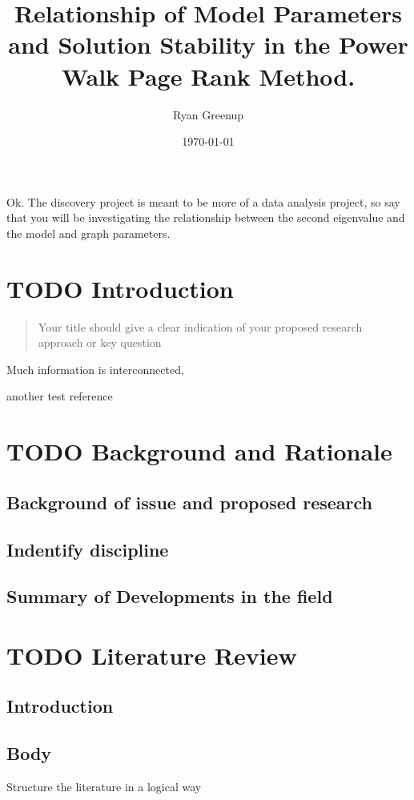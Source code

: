 \documentclass[11pt]{article}
\author{Ryan Greenup}
\date{\today}
\title{Relationship of Model Parameters and Solution Stability in the Power Walk Page Rank Method.}
\begin{document}
\maketitle
\tableofcontents

Ok. The discovery project is meant to be more of a data analysis project, so say
that you will be investigating the relationship between the second eigenvalue
and the model and graph parameters.

\section{{\bfseries\sffamily TODO} Introduction}
\label{sec:org19b18a9}
\begin{quote}
Your title should give a clear indication of your proposed research approach or
key question
\end{quote}

Much information is interconnected, \cite{teamSparseMatrixOperations}


another test reference \cite{kamvarAdaptiveMethodsComputation2004}

\section{{\bfseries\sffamily TODO} Background and Rationale}
\label{sec:orgf7c13c7}
\subsection{Background of issue and proposed research}
\label{sec:org5d62ccf}
\subsection{Indentify discipline}
\label{sec:org7f8213d}
\subsection{Summary of Developments in the field}
\label{sec:org34dce0a}
\section{{\bfseries\sffamily TODO} Literature Review}
\label{sec:org7c22388}
\subsection{Introduction}
\label{sec:org5b837e8}
\subsection{Body}
\label{sec:org2320536}
Structure the literature in a logical way
\end{document}
